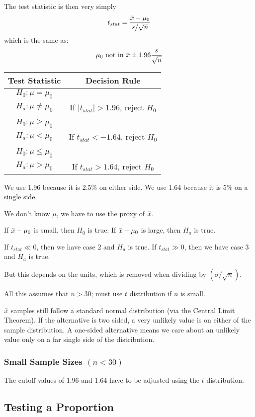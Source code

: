 \documentclass[11pt, oneside]{article}   	%
\newcommand{\overbar}[1]{\mkern 1.5mu\overline{\mkern-1.5mu#1\mkern-1.5mu}\mkern 1.5mu}
\begin{document}
The test statistic is then very simply
\[
t_{stat} = \frac{\overbar{x} - \mu_0}{s / \sqrt{n}}
\]
which is the same as:
\[
\mu_0 \text{ not in } \overbar{x} \pm 1.96 \frac{s}{\sqrt{n}}
\]

\begin{tabular}{ c  c }
Test Statistic & Decision Rule \\
\hline
$H_0 : \mu = \mu_0$ \\      $H_a : \mu \neq \mu_0$ & If $|t_{stat}| > 1.96$, reject $H_0$ \\
 & \\
$H_0 : \mu \geq \mu_0$ \\ $H_a : \mu < \mu_0$      & If $t_{stat} < -1.64$, reject $H_0$ \\
 & \\
$H_0 : \mu \leq \mu_0$ \\ $H_a : \mu > \mu_0$      & If $t_{stat} > 1.64$, reject $H_0$ \\
\end{tabular}

We use 1.96 because it is 2.5\% on either side. We use 1.64 because it is 5\% on a single side.

We don't know $\mu$, we have to use the proxy of $\overbar{x}$. 

If $\overbar{x} - \mu_0$ is small, then $H_0$ is true. If $\overbar{x} - \mu_0$ is large, then $H_a$ is true.

If $t_{stat}  \ll 0$, then we have case 2 and $H_a$ is true. If $t_{stat} \gg 0$, then we have case 3 and $H_a$ is true.

But this depends on the units, which is removed when dividing by $(\sigma / \sqrt{n})$.

All this assumes that $n > 30$; must use $t$ distribution if $n$ is small.

$\overbar{x}$ samples still follow a standard normal distribution (via the Central Limit Theorem). If the alternative is two sided, a very unlikely value is on either of the sample distribution. A one-sided alternative means we care about an unlikely value only on a far single side of the distribution.

\subsubsection{Small Sample Sizes $(n < 30)$}

The cutoff values of 1.96 and 1.64 have to be adjusted using the $t$ distribution.

\subsection{Testing a Proportion}
\end{document}
